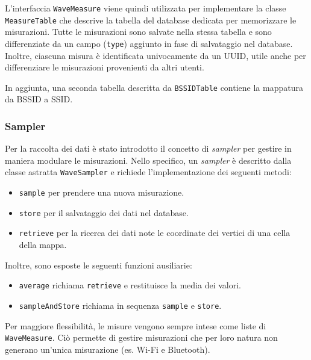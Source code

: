 \documentclass[11pt]{article}
\begin{document}
L'interfaccia \texttt{WaveMeasure} viene quindi utilizzata per implementare la classe \texttt{MeasureTable} che descrive la tabella del database dedicata per memorizzare le misurazioni. 
Tutte le misurazioni sono salvate nella stessa tabella e sono differenziate da un campo (\texttt{type}) aggiunto in fase di salvataggio nel database.
Inoltre, ciascuna misura è identificata univocamente da un UUID, utile anche per differenziare le misurazioni provenienti da altri utenti.

In aggiunta, una seconda tabella descritta da \texttt{BSSIDTable} contiene la mappatura da BSSID a SSID.


\subsubsection{Sampler}
Per la raccolta dei dati è stato introdotto il concetto di \textit{sampler} per gestire in maniera modulare le misurazioni.
Nello specifico, un \textit{sampler} è descritto dalla classe astratta \texttt{WaveSampler} e richiede l'implementazione dei seguenti metodi:
\begin{itemize}
    \item \texttt{sample} per prendere una nuova misurazione.
    \item \texttt{store} per il salvataggio dei dati nel database.
    \item \texttt{retrieve} per la ricerca dei dati note le coordinate dei vertici di una cella della mappa.
\end{itemize}
Inoltre, sono esposte le seguenti funzioni ausiliarie:
\begin{itemize}
    \item \texttt{average} richiama \texttt{retrieve} e restituisce la media dei valori.
    \item \texttt{sampleAndStore} richiama in sequenza \texttt{sample} e \texttt{store}.
\end{itemize}
Per maggiore flessibilità, le misure vengono sempre intese come liste di \texttt{WaveMeasure}. Ciò permette di gestire misurazioni che per loro natura non generano un'unica misurazione (es. Wi-Fi e Bluetooth).
\end{document}

